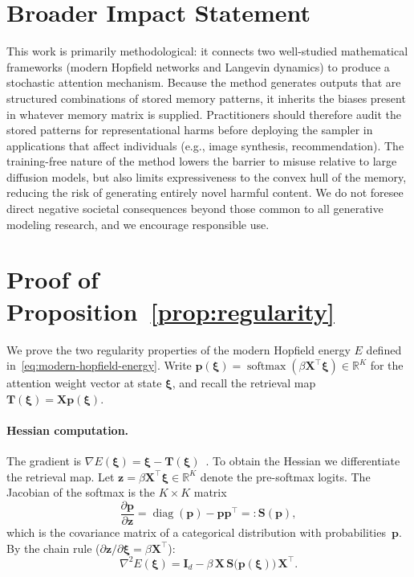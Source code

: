 
\section{Broader Impact Statement}\label{app:broader-impact}
This work is primarily methodological: it connects two well-studied mathematical frameworks (modern Hopfield networks and Langevin dynamics) to produce a stochastic attention mechanism. Because the method generates outputs that are structured combinations of stored memory patterns, it inherits the biases present in whatever memory matrix is supplied. Practitioners should therefore audit the stored patterns for representational harms before deploying the sampler in applications that affect individuals (e.g., image synthesis, recommendation). The training-free nature of the method lowers the barrier to misuse relative to large diffusion models, but also limits expressiveness to the convex hull of the memory, reducing the risk of generating entirely novel harmful content. We do not foresee direct negative societal consequences beyond those common to all generative modeling research, and we encourage responsible use.

\section{Proof of Proposition~\ref{prop:regularity}}\label{app:proof-regularity}

We prove the two regularity properties of the modern Hopfield energy $E$ defined in~\eqref{eq:modern-hopfield-energy}. Write $\mathbf{p}(\boldsymbol{\xi})=\operatorname{softmax}(\beta\mathbf{X}^{\top}\boldsymbol{\xi})\in\mathbb{R}^K$ for the attention weight vector at state $\boldsymbol{\xi}$, and recall the retrieval map $\mathbf{T}(\boldsymbol{\xi})=\mathbf{X}\mathbf{p}(\boldsymbol{\xi})$.

\paragraph{Hessian computation.}
The gradient is $\nabla E(\boldsymbol{\xi})=\boldsymbol{\xi}-\mathbf{T}(\boldsymbol{\xi})$~\cite{ramsauerHopfieldNetworksAll2021}. To obtain the Hessian we differentiate the retrieval map. Let $\mathbf{z}=\beta\mathbf{X}^{\top}\boldsymbol{\xi}\in\mathbb{R}^K$ denote the pre-softmax logits. The Jacobian of the softmax is the $K\times K$ matrix
\begin{equation}\label{eq:softmax-jacobian}
    \frac{\partial\mathbf{p}}{\partial\mathbf{z}}
    = \operatorname{diag}(\mathbf{p}) - \mathbf{p}\mathbf{p}^{\top}
    =: \mathbf{S}(\mathbf{p}),
\end{equation}
which is the covariance matrix of a categorical distribution with probabilities~$\mathbf{p}$. By the chain rule ($\partial\mathbf{z}/\partial\boldsymbol{\xi}=\beta\mathbf{X}^{\top}$):
\begin{equation}\label{eq:hessian}
    \nabla^{2}E(\boldsymbol{\xi})
    = \mathbf{I}_{d} - \beta\,\mathbf{X}\,\mathbf{S}\bigl(\mathbf{p}(\boldsymbol{\xi})\bigr)\,\mathbf{X}^{\top}.
\end{equation}


